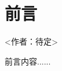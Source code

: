 \chapter{前\quad 言}%

<作者：待定>
\begin{flushleft}  %
\setlength{\parindent}{2em} %

前言内容......

\end{flushleft}